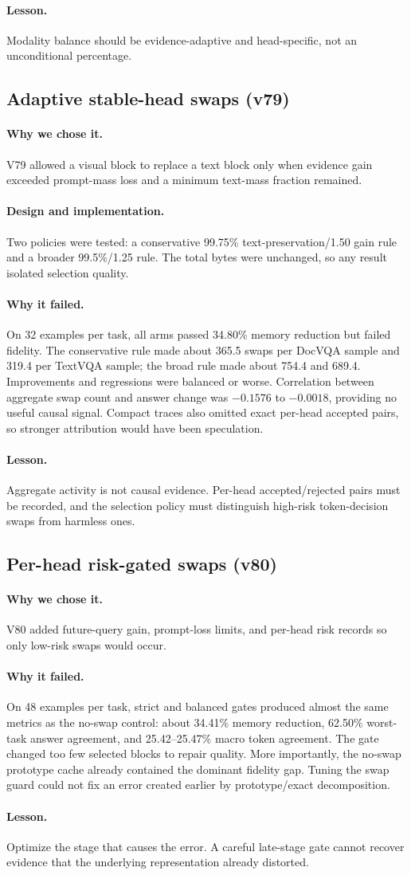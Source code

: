 \documentclass[11pt]{article}
\newcommand{\lesson}{\paragraph{Lesson.}}
\newcommand{\reason}{\paragraph{Why we chose it.}}
\newcommand{\design}{\paragraph{Design and implementation.}}
\newcommand{\failure}{\paragraph{Why it failed.}}
\begin{document}
\lesson
Modality balance should be evidence-adaptive and head-specific, not an unconditional percentage.

\subsection{Adaptive stable-head swaps (v79)}

\reason
V79 allowed a visual block to replace a text block only when evidence gain exceeded prompt-mass
loss and a minimum text-mass fraction remained.

\design
Two policies were tested: a conservative 99.75\% text-preservation/1.50 gain rule and a broader
99.5\%/1.25 rule.  The total bytes were unchanged, so any result isolated selection quality.

\failure
On 32 examples per task, all arms passed 34.80\% memory reduction but failed fidelity.  The
conservative rule made about 365.5 swaps per DocVQA sample and 319.4 per TextVQA sample; the broad
rule made about 754.4 and 689.4.  Improvements and regressions were balanced or worse.  Correlation
between aggregate swap count and answer change was $-0.1576$ to $-0.0018$, providing no useful
causal signal.  Compact traces also omitted exact per-head accepted pairs, so stronger attribution
would have been speculation.

\lesson
Aggregate activity is not causal evidence.  Per-head accepted/rejected pairs must be recorded, and
the selection policy must distinguish high-risk token-decision swaps from harmless ones.

\subsection{Per-head risk-gated swaps (v80)}

\reason
V80 added future-query gain, prompt-loss limits, and per-head risk records so only low-risk swaps
would occur.

\failure
On 48 examples per task, strict and balanced gates produced almost the same metrics as the no-swap
control: about 34.41\% memory reduction, 62.50\% worst-task answer agreement, and 25.42--25.47\%
macro token agreement.  The gate changed too few selected blocks to repair quality.  More
importantly, the no-swap prototype cache already contained the dominant fidelity gap.  Tuning the
swap guard could not fix an error created earlier by prototype/exact decomposition.

\lesson
Optimize the stage that causes the error.  A careful late-stage gate cannot recover evidence that
the underlying representation already distorted.
\end{document}
